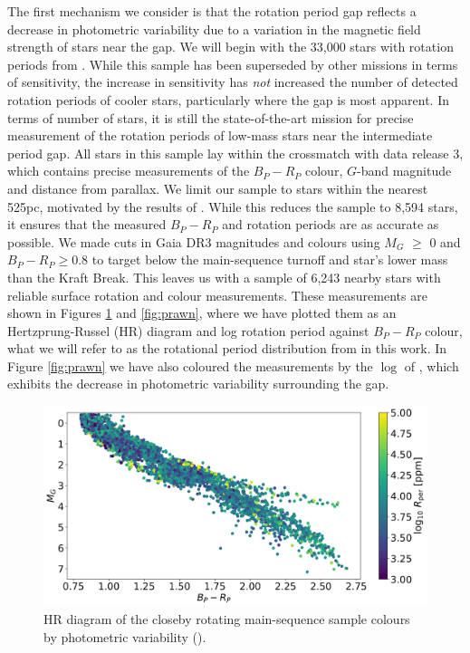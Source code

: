 The first mechanism we consider is that the rotation period gap reflects a decrease in photometric variability due to a variation in the magnetic field strength of stars near the gap.
We will begin with the 33,000 stars with rotation periods from \citet{mcquillan_rotation_2014}.
While this sample has been superseded by other missions in terms of sensitivity, the increase in sensitivity has \textit{not} increased the number of detected rotation periods of cooler stars, particularly where the gap is most apparent.
In terms of number of stars, it is still the state-of-the-art mission for precise measurement of the rotation periods of low-mass stars near the intermediate period gap.
All stars in this sample lay within the crossmatch with \gaia data release 3, which contains precise measurements of the $B_P - R_P$ colour, $G$-band magnitude and distance from parallax.
We limit our sample to stars within the nearest 525pc, motivated by the results of \citet{davenport_rotating_2018}.
While this reduces the sample to 8,594 stars, it ensures that the measured $B_P - R_P$ and rotation periods are as accurate as possible.
We made cuts in Gaia DR3 magnitudes and colours using $M_G$ $\geq$ 0 and $B_P - R_P \geq 0.8$ to target below the main-sequence turnoff and star's lower mass than the Kraft Break.
This leaves us with a sample of 6,243 nearby stars with reliable surface rotation and colour measurements.
These measurements are shown in Figures \ref{fig:hr} and \ref{fig:prawn}, where we have plotted them as an Hertzprung-Russel (HR) diagram and log rotation period against \gaia{} $B_P-R_P$ colour, what we will refer to as the rotational period distribution from in this work.
In Figure \ref{fig:prawn} we have also coloured the measurements by the $\log$ of \rper{}, which exhibits the decrease in photometric variability surrounding the gap.

\begin{figure}
\centering
  \includegraphics[width=\textwidth]{Figures/rot_gap_figures/HR.png}
  \caption{
  HR diagram of the closeby rotating main-sequence sample colours by photometric variability (\rper{}).}
  \label{fig:hr}
\end{figure}


